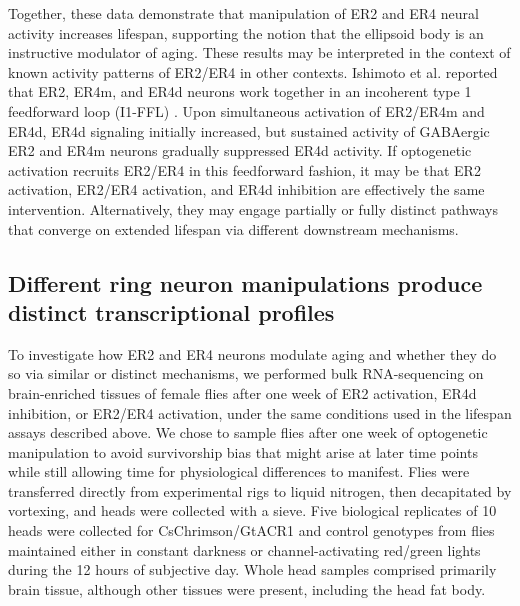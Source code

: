 Together, these data demonstrate that manipulation of ER2 and ER4 neural activity increases lifespan, supporting the notion that the ellipsoid body is an instructive modulator of aging. 
These results may be interpreted in the context of known activity patterns of ER2/ER4 in other contexts. 
Ishimoto et al. reported that ER2, ER4m, and ER4d neurons work together in an incoherent type 1 feedforward loop (I1-FFL) \citep{ishimoto2020}. 
Upon simultaneous activation of ER2/ER4m and ER4d, ER4d signaling initially increased, but sustained activity of GABAergic ER2 and ER4m neurons gradually suppressed ER4d activity. 
If optogenetic activation recruits ER2/ER4 in this feedforward fashion, it may be that ER2 activation, ER2/ER4 activation, and ER4d inhibition are effectively the same intervention. 
Alternatively, they may engage partially or fully distinct pathways that converge on extended lifespan via different downstream mechanisms. 

\subsection*{Different ring neuron manipulations produce distinct transcriptional profiles}

To investigate how ER2 and ER4 neurons modulate aging and whether they do so via similar or distinct mechanisms, we performed bulk RNA-sequencing on brain-enriched tissues of female flies after one week of ER2 activation, ER4d inhibition, or ER2/ER4 activation, under the same conditions used in the lifespan assays described above. 
We chose to sample flies after one week of optogenetic manipulation to avoid survivorship bias that might arise at later time points while still allowing time for physiological differences to manifest. 
Flies were transferred directly from experimental rigs to liquid nitrogen, then decapitated by vortexing, and heads were collected with a sieve. 
Five biological replicates of 10 heads were collected for CsChrimson/GtACR1 and control genotypes from flies maintained either in constant darkness or channel-activating red/green lights during the 12 hours of subjective day. 
Whole head samples comprised primarily brain tissue, although other tissues were present, including the head fat body. 

